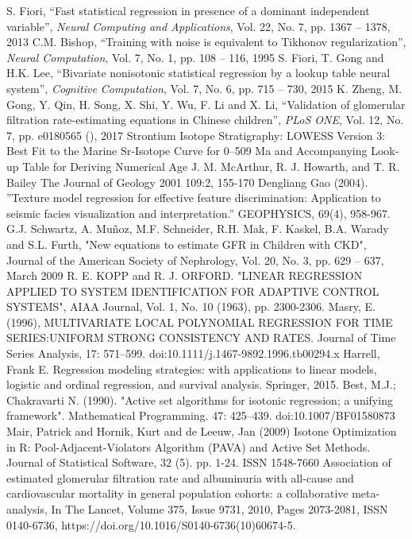 \documentclass[10pt,final]{siamltex}
\begin{document}
\begin{thebibliography}{99}
   S. Fiori, ``Fast statistical regression in presence of a dominant independent variable'', \textit{Neural Computing and Applications}, Vol. 22, No. 7, pp. 1367 -- 1378, 2013
   C.M. Bishop, ``Training with noise is equivalent to Tikhonov regularization'', \textit{Neural Computation}, Vol. 7, No. 1, pp. 108 -- 116, 1995
   S. Fiori, T. Gong and H.K. Lee, ``Bivariate nonisotonic statistical regression by a lookup table neural system'', \textit{Cognitive Computation}, Vol. 7, No. 6, pp. 715 -- 730, 2015
   K. Zheng, M. Gong, Y. Qin, H. Song, X. Shi, Y. Wu, F. Li and X. Li, ``Validation of glomerular filtration rate-estimating equations in Chinese children'', \textit{PLoS ONE}, Vol. 12, No. 7, pp. e0180565 (), 2017
  Strontium Isotope Stratigraphy: LOWESS Version 3: Best Fit to the Marine Sr‐Isotope Curve for 0–509 Ma and Accompanying Look‐up Table for Deriving Numerical Age
J. M. McArthur, R. J. Howarth, and T. R. Bailey
The Journal of Geology 2001 109:2, 155-170
Dengliang Gao (2004). ”Texture model regression for effective feature discrimination: Application to seismic facies visualization and interpretation.” GEOPHYSICS, 69(4), 958-967.
G.J. Schwartz, A. Muñoz, M.F. Schneider, R.H. Mak, F. Kaskel, B.A. Warady and S.L. Furth, "New equations to estimate GFR in Children with CKD", Journal of the American Society of Nephrology, Vol. 20, No. 3, pp. 629 – 637, March 2009
R. E. KOPP and R. J. ORFORD.  "LINEAR REGRESSION APPLIED TO SYSTEM IDENTIFICATION FOR ADAPTIVE CONTROL SYSTEMS", AIAA Journal, Vol. 1, No. 10 (1963), pp. 2300-2306.
Masry, E. (1996), MULTIVARIATE LOCAL POLYNOMIAL REGRESSION FOR TIME SERIES:UNIFORM STRONG CONSISTENCY AND RATES. Journal of Time Series Analysis, 17: 571–599. doi:10.1111/j.1467-9892.1996.tb00294.x
Harrell, Frank E. Regression modeling strategies: with applications to linear models, logistic and ordinal regression, and survival analysis. Springer, 2015.
Best, M.J.; Chakravarti N. (1990). "Active set algorithms for isotonic regression; a unifying framework". Mathematical Programming. 47: 425–439. doi:10.1007/BF01580873
Mair, Patrick and Hornik, Kurt and de Leeuw, Jan (2009) Isotone Optimization in R: Pool-Adjacent-Violators
 Algorithm (PAVA) and Active Set Methods. Journal of Statistical Software, 32 (5). pp. 1-24. ISSN 1548-7660
Association of estimated glomerular filtration rate and albuminuria with all-cause and cardiovascular mortality in general population cohorts: a collaborative meta-analysis, In The Lancet, Volume 375, Issue 9731, 2010, Pages 2073-2081, ISSN 0140-6736, https://doi.org/10.1016/S0140-6736(10)60674-5.

\end{thebibliography}
\end{document}
